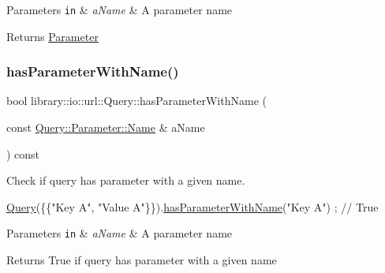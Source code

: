 \begin{DoxyParams}[1]{Parameters}
\mbox{\tt in}  & {\em a\+Name} & A parameter name \\
\hline
\end{DoxyParams}
\begin{DoxyReturn}{Returns}
\hyperlink{classlibrary_1_1io_1_1url_1_1_query_1_1_parameter}{Parameter} 
\end{DoxyReturn}
\mbox{\label{classlibrary_1_1io_1_1url_1_1_query_a19b51e7e6dca5e76284ddf5b62dd4f7f}} 
\subsubsection{\texorpdfstring{has\+Parameter\+With\+Name()}{hasParameterWithName()}}
{\footnotesize\ttfamily bool library\+::io\+::url\+::\+Query\+::has\+Parameter\+With\+Name (\begin{DoxyParamCaption}\item[{const \hyperlink{classlibrary_1_1io_1_1url_1_1_query_1_1_parameter_a7edf5fb8a4ae57aed1ce5dfa2405c981}{Query\+::\+Parameter\+::\+Name} \&}]{a\+Name }\end{DoxyParamCaption}) const}



Check if query has parameter with a given name. 


\begin{DoxyCode}
\hyperlink{classlibrary_1_1io_1_1url_1_1_query_a6781de8f7b7251f8e17c191434b08039}{Query}(\{\{\textcolor{stringliteral}{"Key A"}, \textcolor{stringliteral}{"Value A"}\}\}).\hyperlink{classlibrary_1_1io_1_1url_1_1_query_a19b51e7e6dca5e76284ddf5b62dd4f7f}{hasParameterWithName}(\textcolor{stringliteral}{"Key A"}) ; \textcolor{comment}{// True}
\end{DoxyCode}



\begin{DoxyParams}[1]{Parameters}
\mbox{\tt in}  & {\em a\+Name} & A parameter name \\
\hline
\end{DoxyParams}
\begin{DoxyReturn}{Returns}
True if query has parameter with a given name 
\end{DoxyReturn}
\mbox{\label{classlibrary_1_1io_1_1url_1_1_query_a2f7f9b16e407735269d8e97f12ef9a8b}} 
